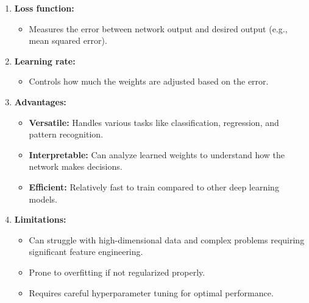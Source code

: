 \documentclass{article}
\begin{document}
\begin{flushleft}
\begin{enumerate}
            \item \textbf{Loss function:}
                \begin{itemize}
                    \item Measures the error between network output and desired output (e.g., mean squared error).
                \end{itemize}
                
			\item \textbf{Learning rate:}
                \begin{itemize}
                    \item Controls how much the weights are adjusted based on the error.
                \end{itemize}
                
            \item \textbf{Advantages:}
                \begin{itemize}
                    \item \textbf{Versatile:} Handles various tasks like classification, regression, and pattern recognition.
					\item \textbf{Interpretable:} Can analyze learned weights to understand how the network makes decisions.
					\item \textbf{Efficient:} Relatively fast to train compared to other deep learning models.
                \end{itemize}

           \item \textbf{Limitations:}
                \begin{itemize}
                    \item Can struggle with high-dimensional data and complex problems requiring significant feature engineering.
					\item Prone to overfitting if not regularized properly.
					\item Requires careful hyperparameter tuning for optimal performance.
                \end{itemize}

        \end{enumerate}


  
    \end{flushleft}

    \section{}
\end{document}
